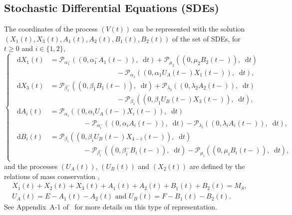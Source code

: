 \documentclass[english]{amsart}
\newcommand{\diff}{\mathop{}\mathopen{}\mathrm{d}}
\newcommand{\cal}[1]{\ensuremath{\mathcal{#1}}}
\numberwithin{proposition}{section}
\begin{document}
\subsection*{Stochastic Differential Equations (SDEs)}
The coordinates of the process $(V(t))$ can be represented with the solution $(X_1(t),X_3(t),A_1(t),A_2(t),B_1(t),B_2(t))$ of the set of SDEs,   for $t{\ge}0$ and $i{\in}\{1,2\}$,
\begin{equation}\label{SDE}
	\begin{cases}
	  \diff X_1(t)&= \cal{P}_{\alpha_1^-}((0, \alpha_1^-A_1(t{-})), \diff t) {+}\cal{P}_{\mu_2}((0, \mu_2B_2(t{-})), \diff t)\\
                &\hspace{4cm}{-}\cal{P}_{\alpha_1}((0,\alpha_1U_A(t{-})X_1(t{-})), \diff t),\\ 
		\diff X_3(t)&= \cal{P}_{\beta_1^-}((0,\beta_1B_1(t{-})), \diff t) {+}\cal{P}_{\lambda_2}((0,\lambda_2A_2(t{-})), \diff t)\\
                &\hspace{4cm}{-}\cal{P}_{\beta_1}((0,\beta_1U_B(t{-})X_3(t{-})), \diff t), \\
		\diff A_i(t)&= \cal{P}_{\alpha_i}((0,\alpha_iU_A(t{-})X_i(t{-})), \diff t)\\
                      &\hspace{2cm}{-}\cal{P}_{\alpha_i^-}((0,\alpha_iA_i(t{-})), \diff t){-}\cal{P}_{\lambda_i}((0,\lambda_iA_i(t{-})), \diff t),\\
		\diff B_i(t)&=\cal{P}_{\beta_i}((0,\beta_iU_B(t{-})X_{4{-}i}(t{-})), \diff t)\\
&\hspace{2cm}{-}\cal{P}_{\beta_i^-}((0,\beta_i^-B_i(t{-})), \diff t){-}\cal{P}_{\mu_i}((0,\mu_iB_i(t{-})), \diff t),\\
	\end{cases}       
\end{equation}
and the processes $(U_A(t))$, $(U_B(t))$ and $(X_2(t))$ are defined by the relations of mass conservation ,
\begin{align}
X_1(t)+X_2(t)+X_3(t)+A_1(t)+A_2(t)+B_1(t)+B_2(t)=M_S,\label{eqCons1}\\
U_A(t)=E{-}A_1(t){-}A_2(t) \text{ and } U_B(t)=F{-}B_1(t){-}B_2(t).\label{eqCons2}
\end{align}
See Appendix~A-1 of~\citet{LR23} for more details on this type of representation.
\end{document}
